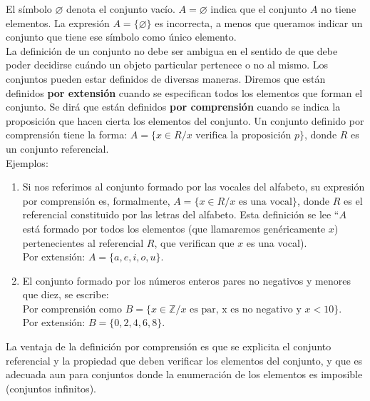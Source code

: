 \documentclass[12pt]{article}
\theoremstyle{definition}
\begin{document}
El símbolo $\varnothing$ denota el conjunto vacío. $ A = \varnothing$ indica que el conjunto $A$ no tiene elementos. La expresión $A = \{\varnothing \}$ es incorrecta, a menos que queramos indicar un conjunto que tiene ese símbolo como único elemento.\\
La definición de un conjunto no debe ser ambigua en el sentido de que debe poder decidirse cuándo un objeto particular pertenece o no al mismo.  Los conjuntos pueden estar definidos de diversas maneras. Diremos que están definidos \textbf{por extensión} cuando se especifican todos los elementos que forman el conjunto. Se dirá que están definidos  \textbf{por comprensión} cuando se indica la proposición que hacen cierta los elementos del conjunto. Un conjunto definido por comprensión tiene la forma: 
$ A = \{x \in R / x  \text{ verifica la proposición } p \} $, donde $R$ es un conjunto referencial.\\

Ejemplos:

\begin{enumerate} [leftmargin=2cm]%

\item Si nos referimos al conjunto formado por las vocales del alfabeto, su expresión por comprensión es, formalmente, $A = \{x \in R / x \text{ es una vocal}\}$, donde $R$ es el referencial constituido por las letras del alfabeto. Esta definición se lee “$A$ está formado por todos los elementos (que llamaremos genéricamente $x$) pertenecientes al referencial $R$, que verifican que $x$ es una vocal).\\
Por extensión: $A = \{a, e, i, o, u\}$.
\item El conjunto formado por los números enteros pares no negativos y menores que diez, se escribe:\\ Por comprensión como $B = \{x \in \mathbb{Z} / x \text{ es par, x es no negativo y } x < 10\}$.\\
Por extensión: $B = \{0, 2, 4, 6, 8\}$.\\
\end{enumerate}

\noindent
La ventaja de la definición por comprensión es que se explicita el conjunto referencial y la propiedad que deben verificar los elementos del conjunto, y que es adecuada aun para conjuntos donde la enumeración de los elementos es imposible (conjuntos infinitos).\\
\vspace{0.5cm}

\end{document}
